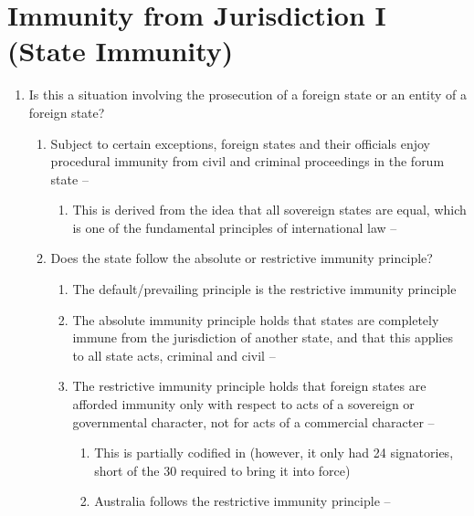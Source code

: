 \section{Immunity from Jurisdiction I (State Immunity)}
\begin{enumerate}
    \item Is this a situation involving the prosecution of a foreign state or an entity of a foreign state?
    \begin{enumerate}
        \item Subject to certain exceptions, foreign states and their officials enjoy procedural immunity from civil and criminal proceedings in the forum state -- 
        \begin{enumerate}
            \item This is derived from the idea that all sovereign states are equal, which is one of the fundamental principles of international law -- 
        \end{enumerate}
        \item Does the state follow the absolute or restrictive immunity principle?
        \begin{enumerate}
            \item The default/prevailing principle is the restrictive immunity principle
            \item The absolute immunity principle holds that states are completely immune from the jurisdiction of another state, and that this applies to all state acts, criminal and civil -- 
            \item The restrictive immunity principle holds that foreign states are afforded immunity only with respect to acts of a sovereign or governmental character, not for acts of a commercial character -- 
            \begin{enumerate}
                \item This is partially codified in  (however, it only had 24 signatories, short of the 30 required to bring it into force)
                \item Australia follows the restrictive immunity principle -- 
            \end{enumerate}

\end{enumerate}
\end{enumerate}
\end{enumerate}
